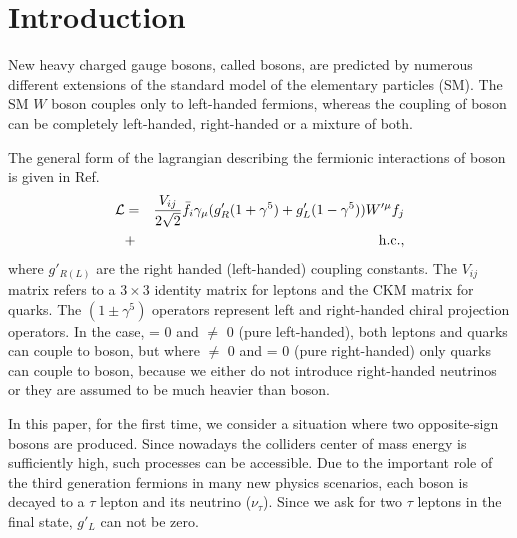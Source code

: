 \section{Introduction}\label{sec:int} 
New heavy charged gauge bosons, called \wprime bosons, are predicted by numerous different extensions of the standard model of the elementary particles (SM). 
The SM $W$ boson couples only to left-handed fermions, whereas the coupling of \wprime boson can be completely left-handed, right-handed or a mixture of both. 

The general form of the lagrangian describing the fermionic interactions of \wprime boson is given in  Ref.~\cite{Sullivan:2002jt}
\begin{eqnarray}
{\cal L}& =& \frac{V_{ij}}{2\sqrt{2}}\bar{f_i} \gamma_{\mu}(g^\prime_{R} (1+{\gamma}^5)+
g^\prime_{L}
(1-{\gamma}^5)) W^{\prime \mu} f_j  \nonumber\\
&+& \mathrm{h.c.},
\label{eq:lagrangian}
\end{eqnarray}
where $g'_{R(L)}$ are the right handed (left-handed) coupling constants. The $V_{ij}$ matrix refers to a $3\times3$ identity matrix for leptons and the CKM matrix for quarks. The $(1\pm{\gamma^5})$ operators represent left and right-handed chiral projection operators. In the case, \gR = 0 and \gL $\neq$ 0 (pure left-handed), both leptons and quarks can couple to \wprime boson, but where \gR $\neq$ 0 and \gL = 0 (pure right-handed) only quarks can couple to \wprime boson, because we either do not introduce right-handed neutrinos or they are assumed to be much heavier than \wprime boson. 

In this paper, for the first time, we consider a situation where two opposite-sign \wprime bosons are produced. Since nowadays the colliders center of mass energy is sufficiently high, such processes can be accessible. Due to the important role of the third generation fermions in many new physics scenarios, each \wprime boson is decayed to a $\tau$ lepton and its neutrino ($\nu_{\tau}$). Since we ask for two $\tau$ leptons in the final state, $g'_L$ can not be zero. 


